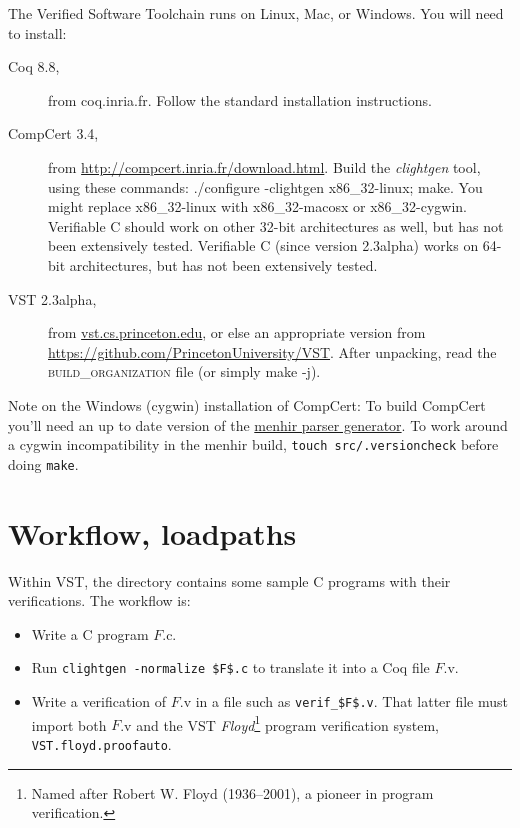 \documentclass[12pt,fleqn,openany,oneside,showtrims]{memoir}
\newcommand\vstversion{2.3alpha}
\newcommand\coqversion{8.8}
\newcommand\compcertversion{3.4}
\begin{document}
The Verified Software Toolchain runs on Linux, Mac, or Windows.
You will need to install:

\begin{description}
\item[Coq \coqversion{},] from coq.inria.fr.  Follow the standard installation instructions.
\item[CompCert \compcertversion{},] from \href{http://compcert.inria.fr/download.html}{http://compcert.inria.fr/download.html}.
  Build the \emph{clightgen} tool, using these commands:
  \textsf{./configure -clightgen x86\_32-linux; make}.  You might replace
  x86\_32-linux with x86\_32-macosx or x86\_32-cygwin.  Verifiable C should work
  on other 32-bit architectures as well, but has not been extensively tested.
  Verifiable C (since version 2.3alpha) works on 64-bit architectures, but
  has not been extensively tested.
\item[VST \vstversion{},] from \href{vst.cs.princeton.edu}{vst.cs.princeton.edu},
  or else an appropriate
  version from \href{https://github.com/PrincetonUniversity/VST}{https://github.com/PrincetonUniversity/VST}.
  After unpacking, read the \textsc{build\_organization} file
  (or simply \textsf{make -j}).
\end{description}

{\small
  Note on the Windows (cygwin) installation of CompCert:
  To build CompCert you'll need an up to date version of the
  \href{http://gallium.inria.fr/~fpottier/menhir/}{menhir parser generator}.
  To work around a cygwin incompatibility in the menhir build,
  \lstinline{touch src/.versioncheck} before doing \lstinline{make}.}

\chapter{Workflow, loadpaths}
\label{refman:workflow}
Within VST, the  directory contains some sample C programs
with their verifications.  The workflow is:
\begin{itemize}
\item Write a C program $F$.c.
\item Run \lstinline{clightgen -normalize $F$.c} to translate it into a Coq
file $F$.v.
\item Write a verification of $F$.v in a file such as
\lstinline{verif_$F$.v}.  That latter file must import
both $F$.v and the VST \emph{Floyd}\footnote{Named after Robert W. Floyd (1936--2001), a pioneer in program verification.} program verification system,
\lstinline{VST.floyd.proofauto}.
\end{itemize}
\end{document}
